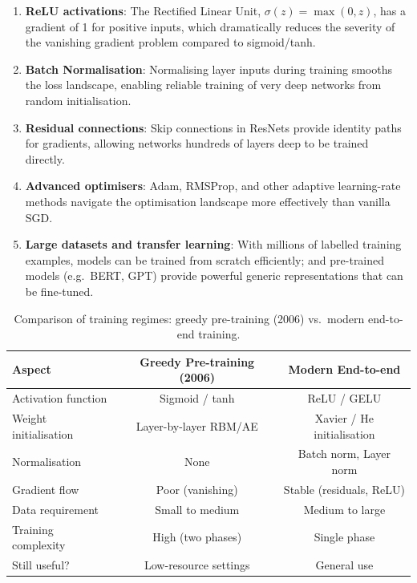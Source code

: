 \documentclass[12pt,a4paper]{article}
\begin{document}
\begin{enumerate}[leftmargin=*, label=(\roman*)]
  \item \textbf{ReLU activations}: The Rectified Linear Unit,
        $\sigma(z) = \max(0, z)$, has a gradient of 1 for positive inputs,
        which dramatically reduces the severity of the vanishing gradient
        problem compared to sigmoid/tanh.
  \item \textbf{Batch Normalisation}: Normalising layer inputs during
        training smooths the loss landscape, enabling reliable training of
        very deep networks from random initialisation.
  \item \textbf{Residual connections}: Skip connections in ResNets provide
        identity paths for gradients, allowing networks hundreds of layers
        deep to be trained directly.
  \item \textbf{Advanced optimisers}: Adam, RMSProp, and other adaptive
        learning-rate methods navigate the optimisation landscape more
        effectively than vanilla SGD.
  \item \textbf{Large datasets and transfer learning}: With millions of
        labelled training examples, models can be trained from scratch
        efficiently; and pre-trained models (e.g.\ BERT, GPT) provide
        powerful generic representations that can be fine-tuned.
\end{enumerate}

\begin{table}[ht]
\centering
\caption{Comparison of training regimes: greedy pre-training (2006) vs.\ modern
end-to-end training.}
\label{tab:modern-vs-pretrain}
\begin{tabular}{lcc}
\toprule
\textbf{Aspect} & \textbf{Greedy Pre-training (2006)} & \textbf{Modern End-to-end} \\
\midrule
Activation function & Sigmoid / tanh & ReLU / GELU \\
Weight initialisation & Layer-by-layer RBM/AE & Xavier / He initialisation \\
Normalisation & None & Batch norm, Layer norm \\
Gradient flow & Poor (vanishing) & Stable (residuals, ReLU) \\
Data requirement & Small to medium & Medium to large \\
Training complexity & High (two phases) & Single phase \\
Still useful? & Low-resource settings & General use \\
\bottomrule
\end{tabular}
\end{table}
\end{document}
